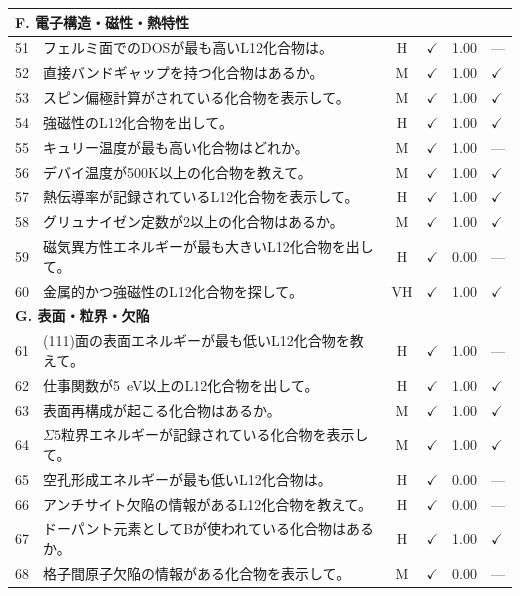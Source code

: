 \documentclass[5p,twocolumn]{elsarticle}
\begin{document}
\begin{longtable}{clcccl}
    \midrule
    \multicolumn{6}{l}{\textbf{F. 電子構造・磁性・熱特性}} \\
    \midrule
    51 & フェルミ面でのDOSが最も高いL12化合物は。 & H & $\checkmark$ & 1.00 & ---\\
    52 & 直接バンドギャップを持つ化合物はあるか。 & M & $\checkmark$ & 1.00 & $\checkmark$ \\
    53 & スピン偏極計算がされている化合物を表示して。 & M & $\checkmark$ & 1.00 & $\checkmark$ \\
    54 & 強磁性のL12化合物を出して。 & H & $\checkmark$ & 1.00 & $\checkmark$ \\
    55 & キュリー温度が最も高い化合物はどれか。 & M & $\checkmark$ & 1.00 & ---\\
    56 & デバイ温度が500K以上の化合物を教えて。 & M & $\checkmark$ & 1.00 & $\checkmark$ \\
    57 & 熱伝導率が記録されているL12化合物を表示して。 & H & $\checkmark$ & 1.00 & $\checkmark$ \\
    58 & グリュナイゼン定数が2以上の化合物はあるか。 & M & $\checkmark$ & 1.00 & $\checkmark$ \\
    59 & 磁気異方性エネルギーが最も大きいL12化合物を出して。 & H & $\checkmark$ & 0.00 & ---\\
    60 & 金属的かつ強磁性のL12化合物を探して。 & VH & $\checkmark$ & 1.00 & $\checkmark$ \\
    \midrule
    \multicolumn{6}{l}{\textbf{G. 表面・粒界・欠陥}} \\
    \midrule
    61 & (111)面の表面エネルギーが最も低いL12化合物を教えて。 & H & $\checkmark$ & 1.00 & ---\\
    62 & 仕事関数が5~eV以上のL12化合物を出して。 & H & $\checkmark$ & 1.00 & $\checkmark$ \\
    63 & 表面再構成が起こる化合物はあるか。 & M & $\checkmark$ & 1.00 & $\checkmark$ \\
    64 & $\Sigma 5$粒界エネルギーが記録されている化合物を表示して。 & M & $\checkmark$ & 1.00 & $\checkmark$ \\
    65 & 空孔形成エネルギーが最も低いL12化合物は。 & H & $\checkmark$ & 0.00 & ---\\
    66 & アンチサイト欠陥の情報があるL12化合物を教えて。 & H & $\checkmark$ & 0.00 & ---\\
    67 & ドーパント元素としてBが使われている化合物はあるか。 & H & $\checkmark$ & 1.00 & $\checkmark$ \\
    68 & 格子間原子欠陥の情報がある化合物を表示して。 & M & $\checkmark$ & 0.00 & ---\\

\end{longtable}
\end{document}

